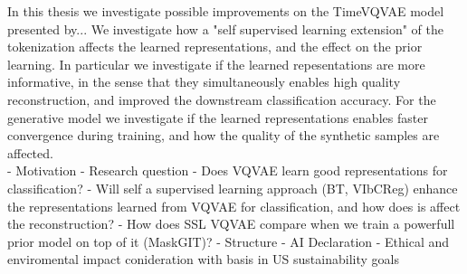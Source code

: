 \documentclass[../../thesis.tex]{subfiles}
\begin{document}
In this thesis we investigate possible improvements on the TimeVQVAE model presented by... We investigate how a "self supervised learning extension" of the tokenization affects the learned representations, and the effect on the prior learning. In particular we investigate if the learned repesentations are more informative, in the sense that they simultaneously enables high quality reconstruction, and improved the downstream classification accuracy. For the generative model we investigate if the learned representations enables faster convergence during training, and how the quality of the synthetic samples are affected. \\


- Motivation
- Research question
	- Does VQVAE learn good representations for classification?
	- Will self a supervised learning approach (BT, VIbCReg) enhance the representations learned from VQVAE for classification, and how does is affect the reconstruction? 
	- How does SSL VQVAE compare when we train a powerfull prior model on top of it (MaskGIT)? 
- Structure
- AI Declaration
- Ethical and enviromental impact conideration with basis in US sustainability goals
\end{document}

